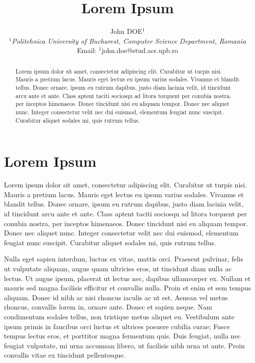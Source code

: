 \documentclass[12pt,a4paper,english,onecolumn]{IEEEtran}
\begin{document}
\title{Lorem Ipsum}

\author{John DOE$^{1}$\\
$^{1}$\emph{Politehnica University of Bucharest, Computer Science Department, Romania}\\
Email: $^{1}$john.doe@stud.acs.upb.ro}

\maketitle

\begin{abstract}

Lorem ipsum dolor sit amet, consectetur adipiscing elit. Curabitur ut turpis nisi. Mauris a pretium lacus. Mauris eget lectus eu ipsum varius sodales. Vivamus et blandit tellus. Donec ornare, ipsum eu rutrum dapibus, justo diam lacinia velit, id tincidunt arcu ante et ante. Class aptent taciti sociosqu ad litora torquent per conubia nostra, per inceptos himenaeos. Donec tincidunt nisi eu aliquam tempor. Donec nec aliquet nunc. Integer consectetur velit nec dui euismod, elementum feugiat nunc suscipit. Curabitur aliquet sodales mi, quis rutrum tellus. 

\end{abstract}

\section{Lorem Ipsum}

 Lorem ipsum dolor sit amet, consectetur adipiscing elit. Curabitur ut turpis nisi. Mauris a pretium lacus. Mauris eget lectus eu ipsum varius sodales. Vivamus et blandit tellus. Donec ornare, ipsum eu rutrum dapibus, justo diam lacinia velit, id tincidunt arcu ante et ante. Class aptent taciti sociosqu ad litora torquent per conubia nostra, per inceptos himenaeos. Donec tincidunt nisi eu aliquam tempor. Donec nec aliquet nunc. Integer consectetur velit nec dui euismod, elementum feugiat nunc suscipit. Curabitur aliquet sodales mi, quis rutrum tellus.

Nulla eget sapien interdum, luctus ex vitae, mattis orci. Praesent pulvinar, felis ut vulputate aliquam, augue quam ultricies eros, ut tincidunt diam nulla ac lectus. Ut augue ipsum, placerat ut lectus nec, dapibus ullamcorper ex. Nullam et mauris sed magna facilisis efficitur et convallis nulla. Proin et enim et sem tempus aliquam. Donec id nibh ac nisi rhoncus iaculis ac ut est. Aenean vel metus rhoncus, convallis lorem in, ornare ante. Donec et sapien neque. Nam condimentum sodales tellus, non tristique metus aliquet eu. Vestibulum ante ipsum primis in faucibus orci luctus et ultrices posuere cubilia curae; Fusce tempus lectus eros, et porttitor magna fermentum quis. Duis feugiat, nulla nec feugiat vulputate, mi urna accumsan libero, ut facilisis nibh urna ut ante. Proin convallis vitae ex tincidunt pellentesque.
\end{document}
